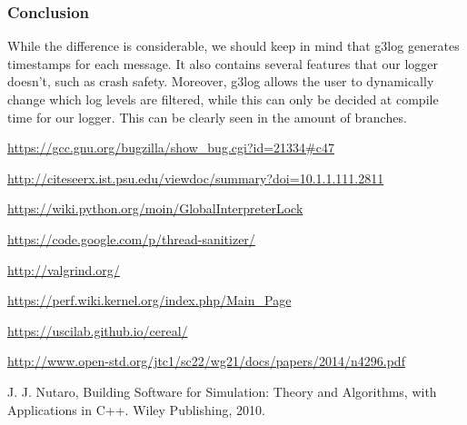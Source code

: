 \documentclass[8pt,a4paper]{report}
\begin{document}
\subsubsection{Conclusion}
While the difference is considerable, we should keep in mind that g3log generates timestamps for each message. It also contains several features that our logger doesn't, such as crash safety. Moreover, g3log allows the user to dynamically change which log levels are filtered, while this can only be decided at compile time for our logger. This can be clearly seen in the amount of branches.

\begin{thebibliography}{1}


   \url{https://gcc.gnu.org/bugzilla/show_bug.cgi?id=21334#c47}

   \url{http://citeseerx.ist.psu.edu/viewdoc/summary?doi=10.1.1.111.2811}
  
   \url{https://wiki.python.org/moin/GlobalInterpreterLock}
  
   \url{https://code.google.com/p/thread-sanitizer/}
  
   \url{http://valgrind.org/}
  
   \url{https://perf.wiki.kernel.org/index.php/Main_Page}
  
   \url{https://uscilab.github.io/cereal/}
  
   \url{http://www.open-std.org/jtc1/sc22/wg21/docs/papers/2014/n4296.pdf}
  
    J. J. Nutaro, Building Software for Simulation: Theory and Algorithms, with
Applications in C++. Wiley Publishing, 2010.


  \end{thebibliography}
\end{document}
